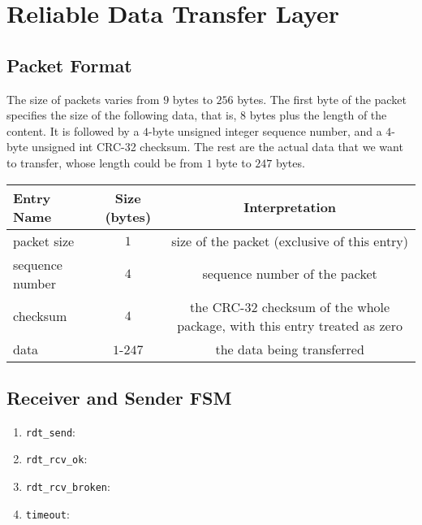 \documentclass[10pt,a4paper]{article}
\begin{document}
\section{Reliable Data Transfer Layer}
\subsection{Packet Format}
    The size of packets varies from $9$ bytes to $256$ bytes. The first byte of the packet specifies the size of the following data, that is, $8$ bytes plus the length of the content. It is followed by a $4$-byte unsigned integer sequence number, and a $4$-byte unsigned int CRC-32 checksum. The rest are the actual data that we want to transfer, whose length could be from $1$ byte to $247$ bytes.

\begin{center}
    \begin{adjustwidth}{-.7cm}{2cm} %
        \begin{tabular}{lcc}
            Entry Name & Size (bytes) & Interpretation \\%
                \hline
            packet size & $1$ &  size of the packet (exclusive of this entry)\\ 
            sequence number & $4$ & sequence number of the packet\\
            checksum & $4$ & the CRC-32 checksum of the whole package, with this entry treated as zero\\
            data & $1$-$247$ & the data being transferred\\
        \end{tabular}
    \end{adjustwidth}
\end{center}
    
\subsection{Receiver and Sender FSM}
    \begin{enumerate}
        \item \texttt{rdt\_send}:
        \item \texttt{rdt\_rcv\_ok}:
        \item \texttt{rdt\_rcv\_broken}:
        \item \texttt{timeout}:
    \end{enumerate}
\end{document}
